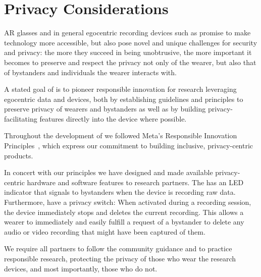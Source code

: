 \section{Privacy Considerations}
\label{sec:privacy}

AR glasses and in general egocentric recording devices such as \AriaDevices{} promise to make technology more accessible, but also pose novel and unique challenges for security and privacy: the more they succeed in being unobtrusive, the more important it becomes to preserve and respect the privacy not only of the wearer, but also that of bystanders and individuals the wearer interacts with. 

A stated goal of  \ProjectAria{} is to pioneer responsible innovation for research leveraging egocentric data and devices, both by establishing guidelines and principles to preserve privacy of wearers and bystanders as well as by building privacy-facilitating features directly into the device where possible. 

Throughout the development of \ProjectAria{} we followed Meta’s Responsible Innovation Principles~\cite{metari}, which express our commitment to building inclusive, privacy-centric products. 

In concert with our principles we have designed and made available privacy-centric hardware and software features to research partners. The \AriaDevice{} has an LED indicator that signals to bystanders when the device is recording raw data. Furthermore, \AriaDevices{} have a privacy switch: When activated during a recording session, the device immediately stops and deletes the current recording. This allows a wearer to immediately and easily fulfill a request of a bystander to delete any audio or video recording that might have been captured of them. 

We require all \ProjectAria{} partners to follow the \ProjectAria{} community guidance \cite{communityguidelines} and to practice responsible research, protecting the privacy of those who wear the research devices, and most importantly, those who do not.
